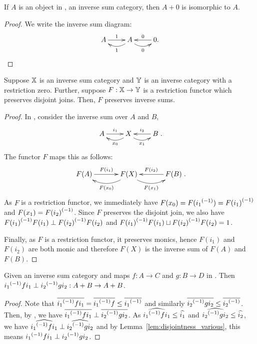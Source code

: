 \begin{lemma}\label{lem:inverse_sums_have_identity_zero}
  If $A$ is an object in \X, an inverse sum category, then $A+0$ is isomorphic to $A$.
\end{lemma}
\begin{proof}
  We write the inverse sum diagram:
  \[
    \xymatrix{
      A\ar[r]^{1} &A\ar@/^9pt/[l]^{1} \ar@/_9pt/[r]_{0} & 0 \ar[l]_{0}.
    }
  \]
\end{proof}
\begin{lemma}\label{lem:functor_preserving_joins_preserves_inverse_sums}
  Suppose $\mathbb{X}$ is an inverse sum category and $\mathbb{Y}$ is an inverse category with a restriction zero.
  Further, suppose $F:\mathbb{X} \to \mathbb{Y}$ is a restriction functor which preserves disjoint joins. Then,
  $F$ preserves inverse sums.
\end{lemma}
\begin{proof}
  In \X, consider the inverse sum over $A$ and $B$,
  \[
    \xymatrix{
      A\ar[r]^{i_1} &X\ar@/^9pt/[l]^{x_0} \ar@/_9pt/[r]_{x_1} & B \ar[l]_{i_2}
    }.
  \]
  The functor $F$ maps this as follows:
  \[
    \xymatrix@R+10pt@C+10pt{
      F(A)\ar[r]^{F(i_1)} &F(X)\ar@/^13pt/[l]^{F(x_0)} \ar@/_13pt/[r]_{F(x_1)} & F(B)\ar[l]_{F(i_2)}
    }.
  \]
  As $F$ is a restriction functor, we immediately have $F(x_0) = F({i_1}^{(-1)}) = {F(i_1)}^{(-1)}$ and
  $F(x_1) = {F(i_2)}^{(-1)}$. Since $F$ preserves the disjoint join, we also have
  ${F(i_1)}^{(-1)}F(i_1) \perp{F(i_2)}^{(-1)}F(i_2)$ and
  ${F(i_1)}^{(-1)}F(i_1) \sqcup {F(i_2)}^{(-1)}F(i_2) = 1$.

  Finally, as $F$ is a restriction functor, it preserves monics, hence $F(i_1)$ and $F(i_2)$ are
  both monic and therefore $F(X)$ is the inverse sum of $F(A)$ and $F(B)$.

\end{proof}
\begin{lemma}\label{lem:inverse_sum_maps_are_perp}
  Given \X an inverse sum category and maps $f:A \to C$ and $g:B\to D$ in \X. Then
  ${i_1}^{(-1)} f i_1 \perp {i_2}^{(-1)} g i_2 : {{A}+{B}}\to {{A}+{B}}$.
\end{lemma}
\begin{proof}
  Note that $\overline{{i_1}^{(-1)} f i_1} = \overline{{i_1}^{(-1)} f} \le \overline{{i_1}^{(-1)}}$ and similarly
  $\overline{{i_2}^{(-1)} g i_2} \le \overline{{i_2}^{(-1)}}$. Then, by , we have
  $\overline{{i_1}^{(-1)} f i_1} \perp \overline{{i_2}^{(-1)} g i_2}$.
  As $\widehat{{i_1}^{(-1)} f i_1} \le \widehat{i_1}$ and  $\widehat{{i_2}^{(-1)} g i_2} \le \widehat{i_2}$, we
  have $\widehat{{i_1}^{(-1)} f i_1} \perp \widehat{{i_2}^{(-1)} g i_2}$ and by
  Lemma~\ref{lem:disjointness_various}, this means  ${i_1}^{(-1)} f i_1\perp {i_2}^{(-1)} g i_2$.
\end{proof}


